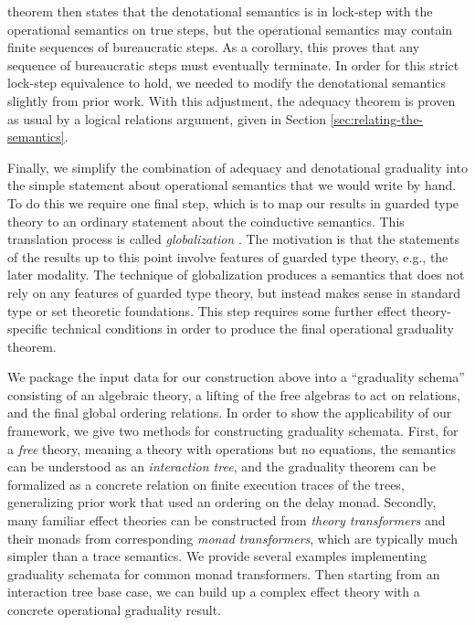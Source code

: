 \documentclass[acmsmall,screen,review,anonymous]{acmart}
\theoremstyle{remark}
\newif\ifdraft
\renewcommand{\max}[1]{\ifdraft{\color{blue}[{\bf Max says}: #1]}\fi}
\begin{document}
theorem then states that the denotational semantics is in lock-step
with the operational semantics on true steps, but the operational
semantics may contain finite sequences of bureaucratic steps. As a
corollary, this proves that any sequence of bureaucratic steps must
eventually terminate. In order for this strict lock-step equivalence
to hold, we needed to modify the denotational semantics slightly from prior work.
With this adjustment, the adequacy theorem is proven as usual by a logical relations
argument, given in Section \ref{sec:relating-the-semantics}.

Finally, we simplify the combination of adequacy and
denotational graduality into the simple statement about operational
semantics that we would write by hand. To do this we require one final
step, which is to map our results in guarded type theory to an
ordinary statement about the coinductive semantics.  This
translation process is called \emph{globalization} \cite{atkey-mcbride2013}. The
motivation is that the statements of the results up to this point
involve features of guarded type theory, e.g., the later modality. The
technique of globalization produces a semantics that does not rely on
any features of guarded type theory, but instead makes sense in
standard type or set theoretic foundations.
%
This step requires some further effect theory-specific technical
conditions in order to produce the final operational graduality
theorem.


We package the input data for our construction above into a ``graduality
schema'' consisting of an algebraic theory, a lifting of the free algebras to
act on relations, and the final global ordering relations. In order to show the
applicability of our framework, we give two methods for constructing graduality
schemata.
%
First, for a \emph{free} theory, meaning a theory with operations but
no equations, the semantics can be understood as an
\emph{interaction tree}, and the graduality theorem can be formalized
as a concrete relation on finite execution traces of the trees,
generalizing prior work that used an ordering on the delay monad.
%
Secondly, many familiar effect theories can be constructed from
\emph{theory transformers} and their monads from corresponding
\emph{monad transformers}, which are typically much simpler than a
trace semantics. We provide several examples implementing graduality
schemata for common monad transformers. Then starting from an
interaction tree base case, we can build up a complex effect theory
with a concrete operational graduality result.
\end{document}
